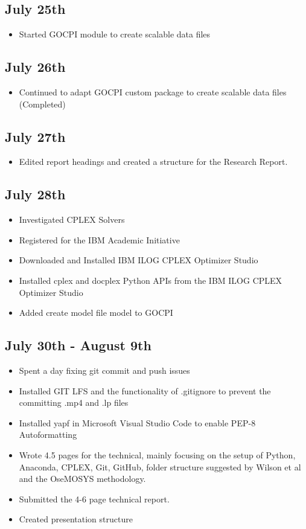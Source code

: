 \documentclass[12pt]{article}
\begin{document}
\subsection{July 25th}
\begin{itemize}
	\item Started GOCPI module to create scalable data files
\end{itemize}
\subsection{July 26th}
\begin{itemize}
	\item Continued to adapt GOCPI custom package to create scalable data files (Completed)
\end{itemize}
\subsection{July 27th}
\begin{itemize}
	\item Edited report headings and created a structure for the Research Report.
\end{itemize}
\subsection{July 28th}
\begin{itemize}
	\item Investigated CPLEX Solvers
	\item Registered for the IBM Academic Initiative
	\item Downloaded and Installed IBM ILOG CPLEX Optimizer Studio
	\item Installed cplex and docplex Python APIs from the IBM ILOG CPLEX Optimizer Studio
	\item Added create model file model to GOCPI
\end{itemize}
\subsection{July 30th - August 9th}
\begin{itemize}
	\item Spent a day fixing git commit and push issues
	\item Installed GIT LFS and the functionality of .gitignore to prevent the committing .mp4 and .lp files
	\item Installed yapf in Microsoft Visual Studio Code to enable PEP-8 Autoformatting
	\item Wrote 4.5 pages for the technical, mainly focusing on the setup of Python, Anaconda, CPLEX, Git, GitHub, folder structure suggested by Wilson et al and the OseMOSYS methodology.
	\item Submitted the 4-6 page technical report.
	\item Created presentation structure 
\end{itemize}
\end{document}
